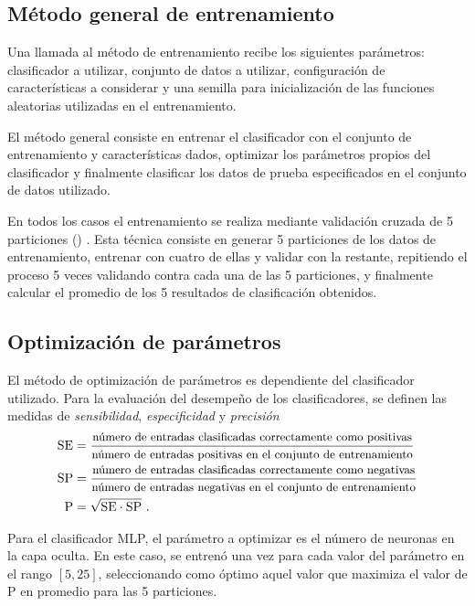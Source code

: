 \documentclass[12pt,bibliography=oldstyle,DIV=12,parskip=half-,titlepage]{scrartcl}
\begin{document}
\subsection{Método general de entrenamiento}
Una llamada al método de entrenamiento recibe los siguientes
parámetros: clasificador a utilizar, conjunto de datos a utilizar,
configuración de características a considerar y una semilla para
inicialización de las funciones aleatorias utilizadas en el
entrenamiento.

El método general consiste en entrenar el clasificador con el conjunto
de entrenamiento y características dados, optimizar los parámetros
propios del clasificador y finalmente clasificar los datos de prueba
especificados en el conjunto de datos utilizado.

En todos los casos el entrenamiento se realiza mediante validación
cruzada de 5 particiones ()
\cite{crossval}. Esta técnica consiste en generar 5 particiones de los
datos de entrenamiento, entrenar con cuatro de ellas y validar con la
restante, repitiendo el proceso 5 veces validando contra cada una de
las 5 particiones, y finalmente calcular el promedio de los 5
resultados de clasificación obtenidos.
%
\subsection{Optimización de parámetros}
El método de optimización de parámetros es dependiente del
clasificador utilizado. Para la evaluación del desempeño de los
clasificadores, se definen las medidas de \emph{sensibilidad},
\emph{especificidad} y \emph{precisión}
\begin{align}
  \textrm{SE} &= \frac{\textrm{\small número de entradas clasificadas
      correctamente como positivas}} {\textrm{\small número de entradas
      positivas en el conjunto de entrenamiento}}\\
  \textrm{SP} &= \frac{\textrm{\small número de entradas
      clasificadas correctamente como negativas}}{\textrm{\small número de
      entradas negativas en el conjunto de entrenamiento}}\\
  \textrm{P} &= \sqrt{\textrm{SE}\cdot\textrm{SP}}\,\,\textrm{.}
\end{align}

Para el clasificador MLP, el parámetro a optimizar es el número de
neuronas en la capa oculta. En este caso, se entrenó una vez para
cada valor del parámetro en el rango $[5,25]$, seleccionando como
óptimo aquel valor que maximiza el valor de P en promedio para las
5 particiones.
\end{document}
